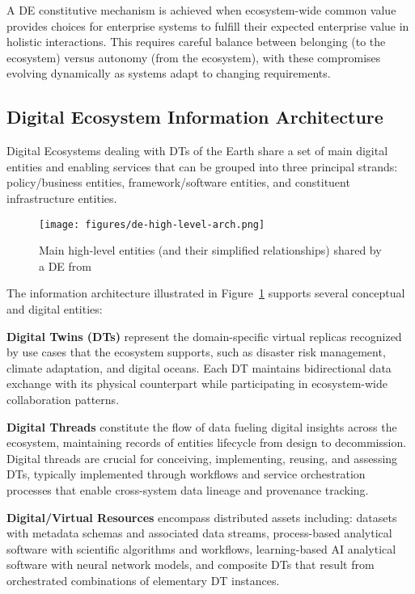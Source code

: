 A DE constitutive mechanism is achieved when ecosystem-wide common value provides choices for
    enterprise systems to fulfill their expected enterprise value in holistic interactions.
This requires careful balance between belonging (to the ecosystem) versus autonomy (from the ecosystem),
    with these compromises evolving dynamically as systems adapt to changing requirements.

\subsection{Digital Ecosystem Information Architecture}

Digital Ecosystems dealing with DTs of the Earth share a set of main digital entities and enabling services
    that can be grouped into three principal strands: policy/business entities, framework/software entities,
    and constituent infrastructure entities.

\begin{figure}[htbp]
    \centering
    \texttt{[image: figures/de-high-level-arch.png]}
    \caption{Main high-level entities (and their simplified relationships) shared by a DE from~\cite{Nativi_2021}}
    \label{fig:de_info_arch}
\end{figure}

The information architecture illustrated in Figure~\ref{fig:de_info_arch} supports several conceptual and digital entities:

\textbf{Digital Twins (DTs)} represent the domain-specific virtual replicas recognized by use cases
    that the ecosystem supports, such as disaster risk management, climate adaptation, and digital oceans.
Each DT maintains bidirectional data exchange with its physical counterpart while
    participating in ecosystem-wide collaboration patterns.

\textbf{Digital Threads} constitute the flow of data fueling digital insights across the ecosystem,
    maintaining records of entities lifecycle from design to decommission.
Digital threads are crucial for conceiving, implementing, reusing, and assessing DTs,
    typically implemented through workflows and service orchestration processes that enable
    cross-system data lineage and provenance tracking.

\textbf{Digital/Virtual Resources} encompass distributed assets including:
    datasets with metadata schemas and associated data streams,
    process-based analytical software with scientific algorithms and workflows,
    learning-based AI analytical software with neural network models,
    and composite DTs that result from orchestrated combinations of elementary DT instances.

